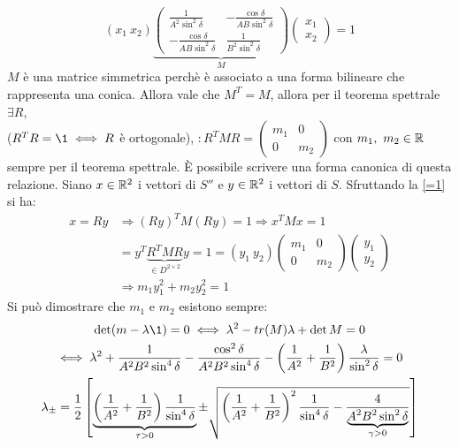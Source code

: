 \documentclass[Main.tex]{subfiles}
\begin{document}
\begin{tema}
\begin{equation}
	\left (x_1 \ x_2 \right) \underbrace{\left( \begin{matrix} \frac{1}{A^2 \sin^2 \delta} & - \frac{\cos \delta}{AB \sin ^2 \delta} \\ - \frac{ \cos \delta}{ AB \sin^2 \delta} & \frac{1}{B^2 \sin^2 \delta} \end{matrix} \right)}_{M} \left( \begin{array}{c} x_1 \\ x_2 \end{array} \right)=1
\end{equation}
$M$ è una matrice simmetrica perchè è associato a una forma bilineare che rappresenta una conica. Allora vale che $M^T=M$, allora per il teorema spettrale $\exists R$, \\ ($R^TR=\1 \iff R$ è ortogonale), $:R^TMR = \left( \begin{matrix} m_1 & 0 \\ 0 & m_2\end{matrix}\right)$ con $m_1, \ m_2  \in \mathbb{R}$ sempre per il teorema spettrale. È possibile scrivere una forma canonica di questa relazione. Siano $x \in \mathbb{R}^2$ i vettori di $S''$ e $y \in \mathbb{R}^2$ i vettori di $S$. Sfruttando la \eqref{=1} si ha:
\begin{equation}
	\begin{split}
	x=Ry &\Rightarrow (Ry)^TM(Ry)=1\Longrightarrow x^TMx=1\\
	&=y^T\underbrace{R^TMR}_{\in D^{2 \times 2}}y = 1 = \left( y_1 \ y_2 \right) \left( \begin{matrix}
 m_1 & 0 \\ 0 & m_2 	
 \end{matrix} \right) \left( \begin{array}{c} y_1 \\ y_2 \end{array} \right)\\
 &\Rightarrow \boxed{ m_1 y_1^2 + m_2 y_2^2 =1}
\end{split}
\end{equation}
Si può dimostrare che $m_1$ e $m_2$ esistono sempre:
\begin{gather}
		\det (m- \lambda \1 ) =0 \iff \lambda^2 - tr(M) \lambda + \det M= 0 \notag \\ \notag
		\iff \lambda^2 + \frac{1}{A^2B^2 \sin^4 \delta} - \frac{ \cos^2 \delta}{A^2B^2 \sin^4 \delta } - \left( \frac{1}{A^2} + \frac{1}{B^2} \right) \frac{\lambda}{\sin^2 \delta} =0\\ \notag
		\lambda_\pm = \frac{1}{2} \left[ \underbrace{\left( \frac{1}{A^2}+ \frac{1}{B^2} \right) \frac{1}{\sin^4\delta}}_{\tau >0} \pm \sqrt{ \left( \frac{1}{A^2}+\frac{1}{B^2} \right)^2 \frac{1}{\sin^4 \delta} - \frac{4}{\underbrace{A^2B^2 \sin^2 \delta}_{\gamma >0} }}\right]

\end{gather}
\end{tema}
\end{document}
